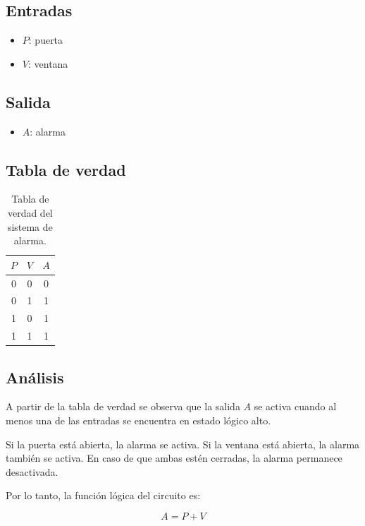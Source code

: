 \documentclass[a4paper,12pt]{article}
\begin{document}
\subsection{Entradas}

\begin{itemize}
	\item $P$: puerta
	\item $V$: ventana
\end{itemize}

\subsection{Salida}

\begin{itemize}
	\item $A$: alarma
\end{itemize}

\subsection{Tabla de verdad}

\begin{table}[h]
	\centering
	\begin{tabular}{|c|c|c|}
		\hline
		$P$ & $V$ & $A$ \\ \hline
		0 & 0 & 0 \\ \hline
		0 & 1 & 1 \\ \hline
		1 & 0 & 1 \\ \hline
		1 & 1 & 1 \\ \hline
	\end{tabular}
	\caption{Tabla de verdad del sistema de alarma.}
	\label{tab:ej4_alarma}
\end{table}

\subsection{Análisis}

A partir de la tabla de verdad se observa que la salida $A$ se activa cuando al menos una de las entradas se encuentra en estado lógico alto.

Si la puerta está abierta, la alarma se activa. Si la ventana está abierta, la alarma también se activa. En caso de que ambas estén cerradas, la alarma permanece desactivada.

Por lo tanto, la función lógica del circuito es:

\[
A = P + V
\]
\end{document}

